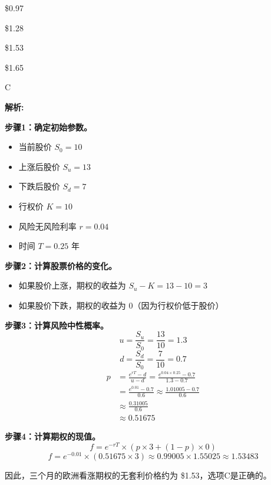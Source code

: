 \documentclass{article}
\newenvironment{explanation}
{\textbf{解析:}\par}
{\par}
\begin{document}
\begin{choices}
    \item \$0.97
    \item \$1.28
    \item \$1.53
    \item \$1.65
\end{choices}

\begin{correctanswer}
    C
\end{correctanswer}

\begin{explanation}
    \textbf{步骤1：确定初始参数。}
    \begin{itemize}
        \item 当前股价 \( S_0 = 10 \)
        \item 上涨后股价 \( S_u = 13 \)
        \item 下跌后股价 \( S_d = 7 \)
        \item 行权价 \( K = 10 \)
        \item 风险无风险利率 \( r = 0.04 \)
        \item 时间 \( T = 0.25 \) 年
    \end{itemize}

    \textbf{步骤2：计算股票价格的变化。}
    \begin{itemize}
        \item 如果股价上涨，期权的收益为 \( S_u - K = 13 - 10 = 3 \)
        \item 如果股价下跌，期权的收益为 \( 0 \)（因为行权价低于股价）
    \end{itemize}

    \textbf{步骤3：计算风险中性概率。}
    \[
    u = \frac{S_u}{S_0} = \frac{13}{10} = 1.3
    \]
    \[
    d = \frac{S_d}{S_0} = \frac{7}{10} = 0.7
    \]
    \begin{align*}
        p &= \frac{e^{rT} - d}{u - d} = \frac{e^{0.04 \times 0.25} - 0.7}{1.3 - 0.7} \\
          &= \frac{e^{0.01} - 0.7}{0.6} \approx \frac{1.01005 - 0.7}{0.6} \\
          &\approx \frac{0.31005}{0.6} \\
          &\approx 0.51675
        \end{align*}

    \textbf{步骤4：计算期权的现值。}
    \[
    f = e^{-rT} \times (p \times 3 + (1 - p) \times 0)
    \]
    \[
    f = e^{-0.01} \times (0.51675 \times 3) \approx 0.99005 \times 1.55025 \approx 1.53483
    \]

    因此，三个月的欧洲看涨期权的无套利价格约为 \$1.53，选项C是正确的。
\end{explanation}
\end{document}
